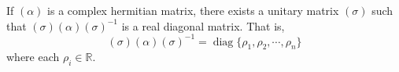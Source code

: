 If $(\alpha)$ is a complex hermitian matrix, there exists a unitary matrix $(\sigma)$ such that $(\sigma)(\alpha)(\sigma)^{-1}$ is a real diagonal matrix. That is,
$$
(\sigma)(\alpha)(\sigma)^{-1} = \operatorname{diag}\{\rho_1, \rho_2, \cdots, \rho_n\}
$$
where each $\rho_i \in \mathbb{R}$.
